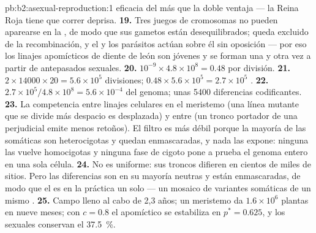 \begin{solution}{pb:b2:asexual-reproduction:1}
eficacia del  más que la doble ventaja --- la Reina Roja tiene que
correr deprisa.
\textbf{19.} Tres juegos de cromosomas no pueden aparearse en la ,
de modo que sus gametos están desequilibrados; queda excluido de la
recombinación, y el  y los parásitos actúan sobre él
sin oposición --- por eso los linajes apomícticos de diente de león son
jóvenes y se forman una y otra vez a partir de antepasados sexuales.
\textbf{20.} $10^{-9}\times 4.8\times 10^{8} = 0.48$ por división.
\textbf{21.} $2\times \num{14000}\times 20 = 5.6\times 10^{5}$
divisiones; $0.48\times 5.6\times 10^{5} = 2.7\times 10^{5}$
.
\textbf{22.} $2.7\times 10^{5}/4.8\times 10^{8} = 5.6\times 10^{-4}$ del
genoma; unas \num{5400} diferencias codificantes.
\textbf{23.} La competencia entre linajes celulares en el meristemo (una
línea mutante que se divide más despacio es desplazada) y entre 
(un tronco portador de una  perjudicial emite menos retoños). El
filtro es más débil porque la mayoría de las  somáticas son
heterocigotas y quedan enmascaradas, y nada las expone: ninguna 
las vuelve homocigotas y ninguna fase de cigoto  pone a prueba
el genoma entero en una sola célula.
\textbf{24.} No es uniforme: sus troncos difieren en cientos de miles de
sitios. Pero las diferencias son en su mayoría neutras y están
enmascaradas, de modo que el  es en la práctica un solo  ---
un mosaico de variantes somáticas de un mismo .
\textbf{25.} Campo lleno al cabo de 2,3 años; un meristemo da
$1.6\times 10^{6}$ plantas en nueve meses; con $c = 0.8$ el apomíctico
se estabiliza en $p^* = 0.625$, y los sexuales conservan el
\qty{37.5}{\%}.
\end{solution}
